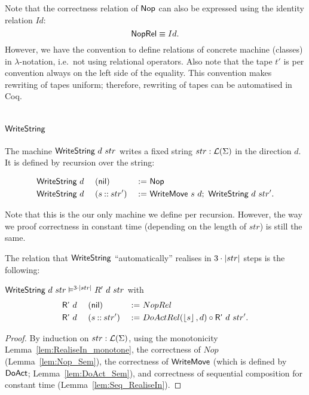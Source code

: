 Note that the correctness relation of $\textsf{Nop}$ can also be expressed using the identity relation $Id$:
\[
  \textsf{NopRel} \equiv Id.
\]
However, we have the convention to define relations of concrete machine (classes) in $\lambda$-notation, i.e.\ not using relational operators.  Also
note that the tape $t'$ is per convention always on the left side of the equality.  This convention makes rewriting of tapes uniform; therefore,
rewriting of tapes can be automatised in Coq.

\section{$\MS{WriteString}$}
\label{sec:WriteString}

The machine $\textsf{WriteString}~d~str$ writes a fixed string $str:\mathcal{L}(\Sigma)$ in the direction $d$.  It is defined by recursion over the string:
\begin{definition}[$\MS{WriteString}$]
  \begin{alignat*}{3}
    &\textsf{WriteString}~d~&&(\textsf{nil})         &~:=~& \textsf{Nop} \\
    &\textsf{WriteString}~d~&&(s \mathbin{::} str') &~:=~& \textsf{WriteMove}~s~d ;~ \textsf{WriteString}~d~str'.
  \end{alignat*}
\end{definition}

Note that this is the our only machine we define per recursion.  However, the way we proof correctness in constant time (depending on the length of
$str$) is still the same.

The relation that $\MS{WriteString}$ ``automatically'' realises in $3 \cdot \left| str \right|$ steps is the following:
\begin{lemma}
  $\textsf{WriteString}~d~str \vDash^{3 \cdot \left| str \right|} R'~d~str$ with
  \begin{alignat*}{3}
    &\textsf{R'}~d~&&(\textsf{nil}        ) &~:=~& NopRel \\
    &\textsf{R'}~d~&&(s \mathbin{::} str') &~:=~& DoActRel(\left\lfloor {s} \right\rfloor, d) \circ \textsf{R'}~d~str'.
  \end{alignat*}
\end{lemma}
\begin{proof}
  By induction on $str:\mathcal{L}(\Sigma)$, using the monotonicity Lemma~\ref{lem:RealiseIn_monotone}, the correctness of $Nop$ (Lemma~\ref{lem:Nop_Sem}),
  the correctness of $\textsf{WriteMove}$ (which is defined by $\textsf{DoAct}$; Lemma~\ref{lem:DoAct_Sem}), and correctness of sequential composition for
  constant time (Lemma~\ref{lem:Seq_RealiseIn}).
\end{proof}


